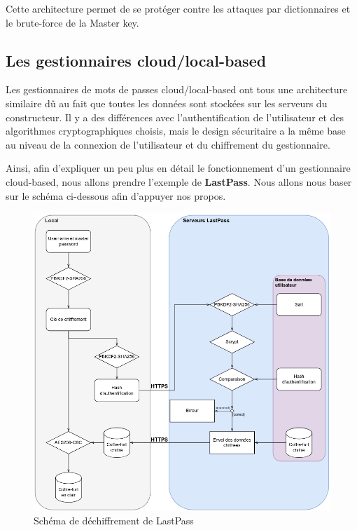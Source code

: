 Cette architecture permet de se protéger contre les attaques par dictionnaires et le brute-force de la Master key.
\newline\newline\newline\newline\newline
\subsection{Les gestionnaires cloud/local-based}
\label{lp}
Les gestionnaires de mots de passes cloud/local-based ont tous une architecture similaire dû au fait que toutes les données sont stockées sur les serveurs du constructeur. Il y a des différences avec l'authentification de l'utilisateur et des algorithmes cryptographiques choisis, mais le design sécuritaire a la même base au niveau de la connexion de l'utilisateur et du chiffrement du gestionnaire. 

Ainsi, afin d'expliquer un peu plus en détail le fonctionnement d'un gestionnaire cloud-based, nous allons prendre l'exemple de \textbf{LastPass}. Nous allons nous baser sur le schéma ci-dessous afin d'appuyer nos propos.
\begin{figure}[h!]
	\includegraphics[width=15.5cm]{images/lastpass_encr.png}
	\centering
	\caption{Schéma de déchiffrement de LastPass}
\end{figure}

